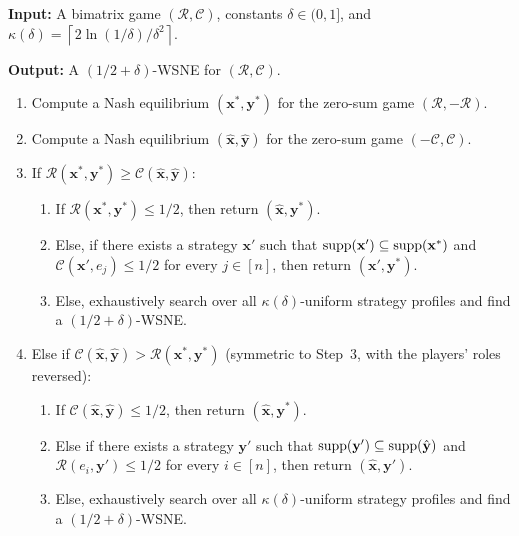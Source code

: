 \begin{algorithm}[H]
  \caption{Main Algorithm for \((1/2+\delta)\)-WSNE}
  \label{alg:full-information}
  \small
  \textbf{Input:} A bimatrix game \((\mathcal{R},\mathcal{C})\), constants
  \(\delta\in(0,1]\), and
  \(\kappa(\delta)=\left\lceil 2\ln(1/\delta)/\delta^2\right\rceil\).\par
  \textbf{Output:} A \((1/2+\delta)\)-WSNE for \((\mathcal{R},\mathcal{C})\).
  \begin{enumerate}[label=\arabic*.,leftmargin=1.8em,itemsep=0.25em,topsep=0.4em]
    \item Compute a Nash equilibrium \((\mathbf{x}^*,\mathbf{y}^*)\) for the zero-sum game \((\mathcal{R},-\mathcal{R})\).
    \item Compute a Nash equilibrium \((\hat{\mathbf{x}},\hat{\mathbf{y}})\) for the zero-sum game \((-\mathcal{C},\mathcal{C})\).
    \item If \(\mathcal{R}(\mathbf{x}^*,\mathbf{y}^*)\geq \mathcal{C}(\hat{\mathbf{x}},\hat{\mathbf{y}})\):
      \begin{enumerate}[label=(\alph*),leftmargin=2.2em,itemsep=0.15em,topsep=0.1em]
        \item If \(\mathcal{R}(\mathbf{x}^*,\mathbf{y}^*)\leq 1/2\), then return \((\hat{\mathbf{x}},\mathbf{y}^*)\).
        \item Else, if there exists a strategy \(\mathbf{x}'\) such that
        \(\operatorname{supp}(\mathbf{x}')\subseteq\operatorname{supp}(\mathbf{x}^*)\) and
        \(\mathcal{C}(\mathbf{x}',e_j)\leq 1/2\) for every \(j\in[n]\), then return \((\mathbf{x}',\mathbf{y}^*)\).
        \item Else, exhaustively search over all \(\kappa(\delta)\)-uniform strategy profiles and find a \((1/2+\delta)\)-WSNE.
      \end{enumerate}
    \item Else if \(\mathcal{C}(\hat{\mathbf{x}},\hat{\mathbf{y}})>\mathcal{R}(\mathbf{x}^*,\mathbf{y}^*)\) (symmetric to Step~3, with the players' roles reversed):
      \begin{enumerate}[label=(\alph*),leftmargin=2.2em,itemsep=0.15em,topsep=0.1em]
        \item If \(\mathcal{C}(\hat{\mathbf{x}},\hat{\mathbf{y}})\leq 1/2\), then return \((\hat{\mathbf{x}},\mathbf{y}^*)\).
        \item Else if there exists a strategy \(\mathbf{y}'\) such that
        \(\operatorname{supp}(\mathbf{y}')\subseteq\operatorname{supp}(\hat{\mathbf{y}})\) and
        \(\mathcal{R}(e_i,\mathbf{y}')\leq 1/2\) for every \(i\in[n]\), then return \((\hat{\mathbf{x}},\mathbf{y}')\).
        \item Else, exhaustively search over all \(\kappa(\delta)\)-uniform strategy profiles and find a \((1/2+\delta)\)-WSNE.
      \end{enumerate}
  \end{enumerate}
\end{algorithm}

